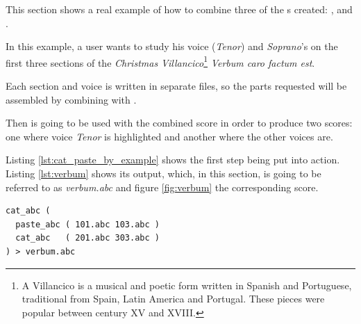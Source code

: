 This section shows a real example of how to combine three of the \abcpt{}s created: \catabc{},
\pasteabc{} and \learningabc{}.

In this example, a user wants to study his voice (\emph{Tenor}) and \emph{Soprano}'s on the first three sections
of the \emph{Christmas Villancico}\footnote{A Villancico is a musical and poetic form written in
Spanish and Portuguese, traditional from Spain, Latin America and Portugal. These pieces were
popular between century XV and XVIII.} \textit{Verbum caro factum est}.

Each section and voice is written in separate files, so the parts requested will be assembled by
combining \pasteabc{} with \catabc{}.

Then \learningabc{} is going to be used with the combined score in order to produce two scores: one
where voice \emph{Tenor} is highlighted and another where the other voices are.

Listing \ref{lst:cat_paste_by_example} shows the first step being put into action. Listing
\ref{lst:verbum} shows its output, which, in this section, is going to be referred to as
\emph{verbum.abc} and figure \ref{fig:verbum} the corresponding score.\\

\begin{lstlisting}[caption={\catabc{} and \pasteabc{} by example},label={lst:cat_paste_by_example},captionpos=t,abovecaptionskip=-\medskipamount]
cat_abc (
  paste_abc ( 101.abc 103.abc )
  cat_abc   ( 201.abc 303.abc )
) > verbum.abc
\end{lstlisting}

\vspace{1cm}


